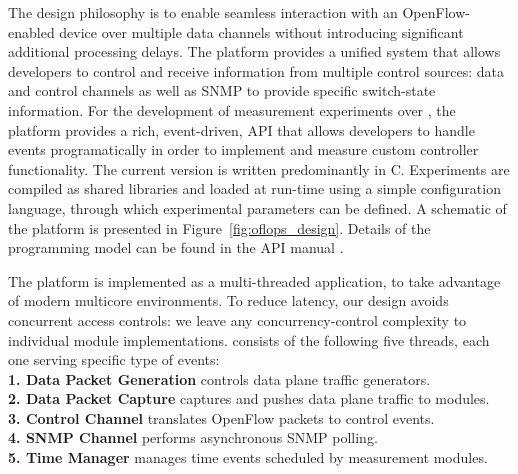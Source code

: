 The  \oflops design philosophy is to enable seamless
interaction with an OpenFlow-enabled device over multiple data channels 
without introducing significant additional processing delays.  
The platform provides a
unified system that allows developers to control and receive
information from multiple control sources: data and control channels
as well as SNMP to provide specific switch-state information.
For the development of measurement experiments over \oflops, the
platform provides a rich, event-driven, API that allows developers to 
handle events programatically in order to implement and measure 
custom controller functionality. The current version is written predominantly
in C. Experiments are compiled as shared libraries and loaded at run-time 
using a simple configuration language, through which experimental parameters 
can be defined.
A schematic of the platform is presented in Figure~\ref{fig:oflops_design}. 
Details of the \oflops programming model can be found in the API manual 
\cite{oflops-manual}.

The platform is implemented as a multi-threaded application, to take
advantage of modern multicore environments. To reduce latency, our design
avoids concurrent access controls: we leave any concurrency-control complexity 
to individual module implementations. \oflops consists of the following five threads, 
each one serving specific type of events:\\
\textbf{1. Data Packet Generation} controls data plane traffic generators.\\
\textbf{2. Data Packet Capture} captures and pushes data plane traffic to modules.\\
\textbf{3. Control Channel} translates OpenFlow packets to control events.\\
\textbf{4. SNMP Channel} performs asynchronous SNMP polling.\\
\textbf{5. Time Manager} manages time events scheduled by measurement modules.

